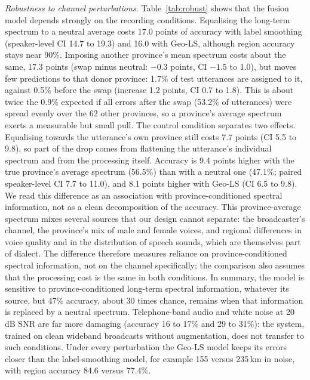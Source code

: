 \documentclass[conference]{IEEEtran}
\begin{document}
\textit{Robustness to channel perturbations.} Table~\ref{tab:robust} shows that the fusion model depends strongly on the recording conditions. Equalising the long-term spectrum to a neutral average costs 17.0 points of accuracy with label smoothing (speaker-level CI 14.7 to 19.3) and 16.0 with Geo-LS, although region accuracy stays near 90\%. Imposing another province's mean spectrum costs about the same, 17.3 points (swap minus neutral: $-0.3$ points, CI $-1.5$ to 1.0), but moves few predictions to that donor province: 1.7\% of test utterances are assigned to it, against 0.5\% before the swap (increase 1.2 points, CI 0.7 to 1.8). This is about twice the 0.9\% expected if all errors after the swap (53.2\% of utterances) were spread evenly over the 62 other provinces, so a province's average spectrum exerts a measurable but small pull. The control condition separates two effects. Equalising towards the utterance's own province still costs 7.7 points (CI 5.5 to 9.8), so part of the drop comes from flattening the utterance's individual spectrum and from the processing itself. Accuracy is 9.4 points higher with the true province's average spectrum (56.5\%) than with a neutral one (47.1\%; paired speaker-level CI 7.7 to 11.0), and 8.1 points higher with Geo-LS (CI 6.5 to 9.8). We read this difference as an association with province-conditioned spectral information, not as a clean decomposition of the accuracy. This province-average spectrum mixes several sources that our design cannot separate: the broadcaster's channel, the province's mix of male and female voices, and regional differences in voice quality and in the distribution of speech sounds, which are themselves part of dialect. The difference therefore measures reliance on province-conditioned spectral information, not on the channel specifically; the comparison also assumes that the processing cost is the same in both conditions. In summary, the model is sensitive to province-conditioned long-term spectral information, whatever its source, but 47\% accuracy, about 30 times chance, remains when that information is replaced by a neutral spectrum. Telephone-band audio and white noise at 20\,dB SNR are far more damaging (accuracy 16 to 17\% and 29 to 31\%): the system, trained on clean wideband broadcasts without augmentation, does not transfer to such conditions. Under every perturbation the Geo-LS model keeps its errors closer than the label-smoothing model, for example 155 versus 235\,km in noise, with region accuracy 84.6 versus 77.4\%.
\end{document}
